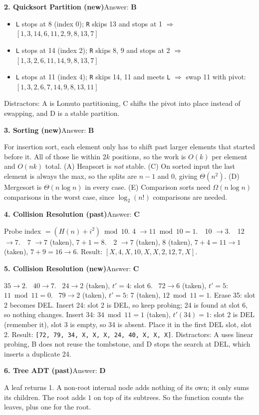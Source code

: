 \documentclass[11pt]{article}
\newcommand{\answer}[2]{\par\medskip\noindent\textbf{#1}\quad Answer: \textbf{#2}\par\nobreak\smallskip}
\begin{document}
\answer{2. Quicksort Partition (new)}{B}
\begin{itemize}[nosep]
  \item \texttt{L} stops at 8 (index 0); \texttt{R} skips 13 and stops at 1 $\Rightarrow$ $[1,3,14,6,11,2,9,8,13,7]$
  \item \texttt{L} stops at 14 (index 2); \texttt{R} skips 8, 9 and stops at 2 $\Rightarrow$ $[1,3,2,6,11,14,9,8,13,7]$
  \item \texttt{L} stops at 11 (index 4); \texttt{R} skips 14, 11 and meets \texttt{L} $\Rightarrow$ swap 11 with pivot:\\ \hspace*{1em}$[1,3,2,6,7,14,9,8,13,11]$
\end{itemize}
Distractors: A is Lomuto partitioning, C shifts the pivot into place instead of swapping, and D is a stable partition.

\answer{3. Sorting (new)}{B}
For insertion sort, each element only has to shift past larger elements that started before it. All of those lie within
$2k$ positions, so the work is $O(k)$ per element and $O(nk)$ total.
(A) Heapsort is \emph{not} stable.
(C) On sorted input the last element is always the max, so the splits are $n-1$ and $0$, giving $\Theta(n^2)$.
(D) Mergesort is $\Theta(n\log n)$ in every case.
(E) Comparison sorts need $\Omega(n\log n)$ comparisons in the worst case, since $\log_2(n!)$ comparisons are needed.

\answer{4. Collision Resolution (past)}{C}
Probe index $= (H(n) + i^2) \bmod 10$.
4 $\to 11 \bmod 10 = 1$.\ \
10 $\to 3$.\ \
12 $\to 7$.\ \
7 $\to 7$ (taken), $7+1=8$.\ \
2 $\to 7$ (taken), 8 (taken), $7+4=11\to1$ (taken), $7+9=16\to6$.
Result: $[X,4,X,10,X,X,2,12,7,X]$.

\answer{5. Collision Resolution (new)}{C}
$35\to2$. \ $40\to7$. \ $24\to2$ (taken), $t'=4$: slot 6. \ $72\to6$ (taken), $t'=5$: $11\bmod11=0$. \
$79\to2$ (taken), $t'=5$: 7 (taken), $12\bmod11=1$.
Erase 35: slot 2 becomes DEL.
Insert 24: slot 2 is DEL, so keep probing; 24 is found at slot 6, so nothing changes.
Insert 34: $34\bmod11=1$ (taken), $t'(34)=1$: slot 2 is DEL (remember it), slot 3 is empty, so 34 is absent. Place it in the
first DEL slot, slot 2.
Result: \texttt{[72, 79, 34, X, X, X, 24, 40, X, X, X]}.
Distractors: A uses linear probing, B does not reuse the tombstone, and D stops the search at DEL, which inserts a duplicate 24.

\answer{6. Tree ADT (past)}{D}
A leaf returns 1. A non-root internal node adds nothing of its own; it only sums its children. The root adds
$1$ on top of its subtrees. So the function counts the leaves, plus one for the root.
\end{document}
